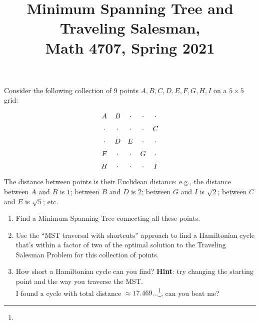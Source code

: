 \documentclass[11pt]{article}
\title{Minimum Spanning Tree and Traveling Salesman, \\ Math 4707, Spring 2021}
\date{}
\begin{document}
\maketitle

\thispagestyle{empty}


Consider the following collection of $9$ points $A,B,C,D,E,F,G,H,I$ on a $5\times 5$ grid:
\[ \renewcommand\arraystretch{1.5}
\begin{array}{c c c c c}
A & B & \cdot & \cdot & \cdot \\
\cdot & \cdot &\cdot & \cdot & C \\
\cdot & D & E & \cdot & \cdot \\
F & \cdot & \cdot & G & \cdot \\
H & \cdot & \cdot & \cdot & I
\end{array}\]
The distance between points is their Euclidean distance: e.g., the distance between $A$ and $B$ is $1$; between $B$ and $D$ is $2$; between $G$ and $I$ is $\sqrt{2}$; between $C$ and $E$ is $\sqrt{5}$; etc.

\begin{enumerate}
\item Find a Minimum Spanning Tree connecting all these points.
\item Use the ``MST traversal with shortcuts'' approach to find a Hamiltonian cycle that's within a factor of two of the optimal solution to the Traveling Salesman Problem for this collection of points.
\item How short a Hamiltonian cycle can you find? {\bf Hint}: try changing the starting point and the way you traverse the MST. \\
I found a cycle with total distance $\approx 17.469...$\footnote{\scalebox{-1}{\scriptsize DFHEGICBAD}}, can you beat me?

\end{enumerate}
\end{document}
